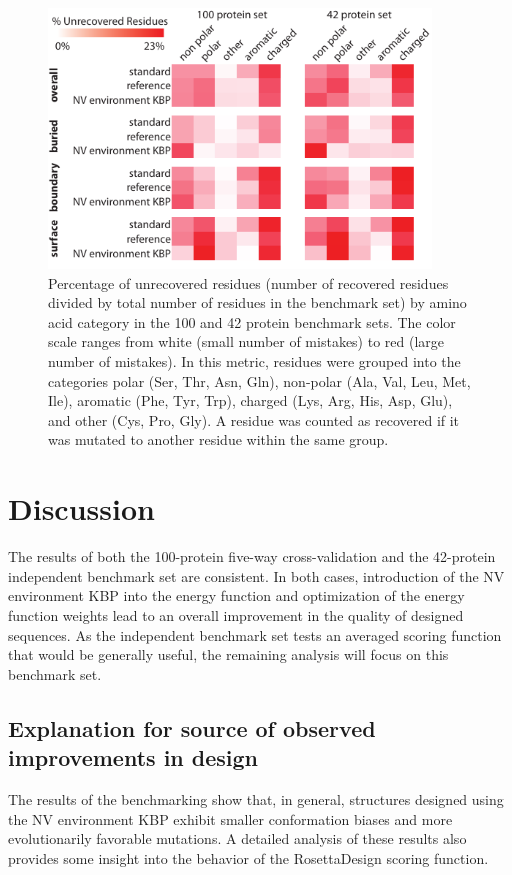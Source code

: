 \begin{figure}
\centering
\includegraphics[width=4in]{figures/nv_kbp/recovery_by_group}
\caption{
Percentage of unrecovered residues (number of recovered residues divided by total number of residues in the benchmark set) by amino acid category in the 100 and 42 protein benchmark sets.
The color scale ranges from white (small number of mistakes) to red (large number of mistakes).
In this metric, residues were grouped into the categories polar (Ser, Thr, Asn, Gln), non-polar (Ala, Val, Leu, Met, Ile), aromatic (Phe, Tyr, Trp), charged (Lys, Arg, His, Asp, Glu), and other (Cys, Pro, Gly).
A residue was counted as recovered if it was mutated to another residue within the same group.
}
\label{fig:recovery_by_group}
\end{figure}

\section{Discussion}

The results of both the 100-protein five-way cross-validation and the 42-protein independent benchmark set are consistent.
In both cases, introduction of the \ac{NV} environment \ac{KBP} into the energy function and optimization of the energy function weights lead to an overall improvement in the quality of designed sequences.
As the independent benchmark set tests an averaged scoring function that would be generally useful, the remaining analysis will focus on this benchmark set. 

\subsection{Explanation for source of observed improvements in design}
The results of the benchmarking show that, in general, structures designed using the \ac{NV} environment \ac{KBP} exhibit smaller conformation biases and more evolutionarily favorable mutations.
A detailed analysis of these results also provides some insight into the behavior of the RosettaDesign scoring function.

